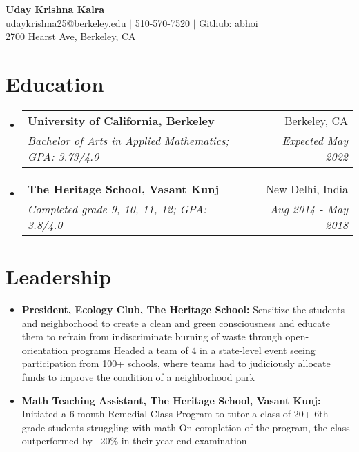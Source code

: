 \documentclass[letterpaper,10pt]{article}
\makeatletter
\newcommand{\resumeItemNoBullet}[2]{
  \item[]\small{
    \hspace{-9pt}\textbf{#1}{: #2 \vspace{-6pt}}
  }
}
\newcommand{\resumeSubheading}[4]{
  \vspace{-1pt}\item[]
  \begin{tabular*}{0.98\textwidth}{l@{\extracolsep{\fill}}r}
      \hspace{-10pt}\textbf{#1} & #2 \\
      \hspace{-10pt}\textit{\small#3} & \textit{\small #4} \\
    \end{tabular*}\vspace{-5pt}
}
\newcommand{\resumeSubHeadingListStart}{\begin{itemize}[leftmargin=*]}
\newcommand{\resumeSubHeadingListEnd}{\end{itemize}}
\newcommand{\shorterSection}[1]{\vspace{-10pt}\section{#1}}
\makeatother
\begin{document}
\begin{center}
  \small \textbf{\href{abhoi.github.io}{\huge Uday Krishna Kalra}} \\  \href{mailto:udaykrishna25@berkeley.edu}{\color{blue}\underline{udaykrishna25@berkeley.edu}} $\vert$
  510-570-7520 $\vert$
  Github: \href{https://github.com/udaykrishna25}{\color{blue}\underline{abhoi}} \\
  \small 2700 Hearst Ave, Berkeley, CA
\end{center}

\shorterSection{Education}
  \resumeSubHeadingListStart
    \resumeSubheading
      {University of California, Berkeley}{Berkeley, CA}
      {Bachelor of Arts in Applied Mathematics;  GPA: 3.73/4.0}{Expected May 2022}
    \resumeSubheading
      {The Heritage School, Vasant Kunj}{New Delhi, India}
      {Completed grade 9, 10, 11, 12;  GPA: 3.8/4.0 }{Aug 2014 - May 2018}
  \resumeSubHeadingListEnd

\shorterSection{Leadership}
  \resumeSubHeadingListStart
  \small
    \item{
     \textbf{President, Ecology Club, The Heritage School:}\newline
     {Sensitize the students and neighborhood to create a clean and green consciousness and educate them to refrain from
indiscriminate burning of waste through open-orientation programs}\newline
    {Headed a team of 4 in a state-level event seeing participation from 100+ schools, where teams had to judiciously allocate funds to improve the condition of a neighborhood park}
     \hfill}
    \vspace{-5pt}
    \item{
     \textbf{Math Teaching Assistant, The Heritage School, Vasant Kunj:}\newline
        {Initiated a 6-month Remedial Class Program to tutor a class of 20+ 6th grade students struggling with math}\newline
        {On completion of the program, the class outperformed by ~20\% in their year-end examination}
    }
\resumeSubHeadingListEnd
\end{document}
